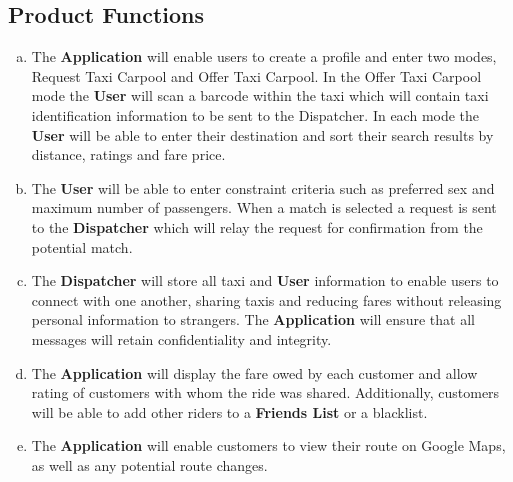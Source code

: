 \documentclass[english]{article}
\begin{document}
\subsection{Product Functions}
\label{sub:product_functions}
\begin{enumerate}[a)]
	\item The \textbf{Application} will enable users to create a profile and enter two modes, Request Taxi Carpool and Offer Taxi Carpool. In the Offer Taxi Carpool mode the \textbf{User} will scan a barcode within the taxi which will contain taxi identification information to be sent to the Dispatcher. In each mode the \textbf{User} will be able to enter their destination and sort their search results by distance, ratings and fare price. 
	
	\item The \textbf{User} will be able to enter constraint criteria such as preferred sex and maximum number of passengers. When a match is selected a request is sent to the \textbf{Dispatcher} which will relay the request for confirmation from the potential match. 
	
	\item The \textbf{Dispatcher} will store all taxi and \textbf{User} information to enable users to connect with one another, sharing taxis and reducing fares without releasing personal information to strangers. The \textbf{Application} will ensure that all messages will retain confidentiality and integrity.
	
	\item The \textbf{Application} will display the fare owed by each customer and allow rating of customers with whom the ride was shared. Additionally, customers will be able to add other riders to a \textbf{Friends List} or a blacklist.
	
	\item The \textbf{Application} will enable customers to view their route on Google Maps, as well as any potential route changes.
\end{enumerate}
\end{document}
